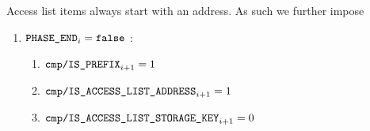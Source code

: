 Access list items always start with an address.
As such we further impose
\begin{enumerate}[resume]
	\item \If $\texttt{PHASE\_END} _{i} = \texttt{false}$ \Then:
		\begin{enumerate}
			\item $\texttt{cmp}\texttt{/}\texttt{{\texttt{IS\_PREFIX}}} _{i + 1} = 1$
			\item $\texttt{cmp}\texttt{/}\texttt{{IS\_ACCESS\_LIST\_ADDRESS}}   _{i + 1} = 1$
			\item $\texttt{cmp}\texttt{/}\texttt{{IS\_ACCESS\_LIST\_STORAGE\_KEY}}    _{i + 1} = 0$
		\end{enumerate}
\end{enumerate}

